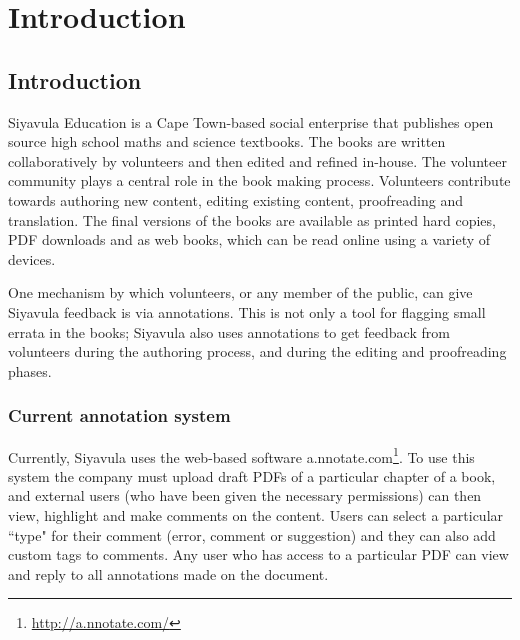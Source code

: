 
\chapter{Introduction} %

\label{Chapter1} %



\section{Introduction}
Siyavula Education is a Cape Town-based social enterprise that publishes open source high school maths and science textbooks. The books are written collaboratively by volunteers and then edited and refined in-house. The volunteer community plays a central role in the book making process. Volunteers contribute towards authoring new content, editing existing content, proofreading and translation. The final versions of the books are available as printed hard copies, PDF downloads and as web books, which can be read online using a variety of devices. 

One mechanism by which volunteers, or any member of the public, can give Siyavula feedback is via annotations. This is not only a tool for flagging small errata in the books; Siyavula also uses annotations to get feedback from volunteers during the authoring process, and during the editing and proofreading phases.


\subsection{Current annotation system}

Currently, Siyavula uses the web-based software a.nnotate.com\footnote{\href{ http://a.nnotate.com/}{ http://a.nnotate.com/}}. To use this system the company must upload draft PDFs of a particular chapter of a book, and external users (who have been given the necessary permissions) can then view, highlight and make comments on the content. Users can select a particular ``type" for their comment (error, comment or suggestion) and they can also add custom tags to comments. Any user who has access to a particular PDF can view and reply to all annotations made on the document. 

